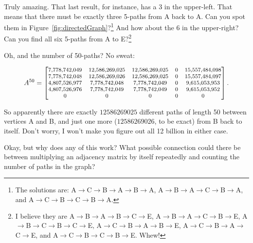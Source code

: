 \begin{alttitles}
Truly amazing. That last result, for instance, has a 3 in the upper-left. That
means that there must be exactly three 5-paths from A back to A. Can you spot
them in Figure~\ref{fig:directedGraph}?\footnote{The solutions are:
A$\rightarrow$C$\rightarrow$B$\rightarrow$A$\rightarrow$B$\rightarrow$A,
A$\rightarrow$B$\rightarrow$A$\rightarrow$C$\rightarrow$B$\rightarrow$A, and
A$\rightarrow$C$\rightarrow$B$\rightarrow$C$\rightarrow$B$\rightarrow$A.}
And how about the 6 in the upper-right? Can you find all six 5-paths from A to
E?\footnote{
I believe they are 
A$\rightarrow$B$\rightarrow$A$\rightarrow$B$\rightarrow$C$\rightarrow$E,
A$\rightarrow$B$\rightarrow$A$\rightarrow$C$\rightarrow$B$\rightarrow$E,
A$\rightarrow$B$\rightarrow$C$\rightarrow$B$\rightarrow$C$\rightarrow$E,
A$\rightarrow$C$\rightarrow$B$\rightarrow$A$\rightarrow$B$\rightarrow$E,
A$\rightarrow$C$\rightarrow$B$\rightarrow$A$\rightarrow$C$\rightarrow$E, and
A$\rightarrow$C$\rightarrow$B$\rightarrow$C$\rightarrow$B$\rightarrow$E. Whew!}

Oh, and the number of 50-paths? No sweat:

\vspace{-.20in}
\begin{align*}
\footnotesize
A^{50} = 
\begin{bmatrix}
 \num{7778742049} & \num{12586269025} &\num{12586269025} & 0 & \num{15557484098} \\
 \num{7778742048} & \num{12586269026} & \num{12586269025} & 0 & \num{15557484097} \\
 \num{4807526977} & \num{7778742048} & \num{7778742049} & 0 &  \num{9615053953} \\
 \num{4807526976} & \num{7778742049} & \num{7778742049} & 0 &  \num{9615053952} \\
          0      &               0 &                0 & 0 &                0 \\
\end{bmatrix}.
\end{align*}
\vspace{-.15in}

So apparently there are exactly $\num{12586269025}$ different paths of length
50 between vertices A and B, and just one more ($\num{12586269026}$, to be
exact) from B back to itself. Don't worry, I won't make you figure out all 12
billion in either case.

\smallskip

Okay, but why does any of this work? What possible connection could there be
between multiplying an adjacency matrix by itself repeatedly and counting the
number of paths in the graph?


\end{alttitles}
